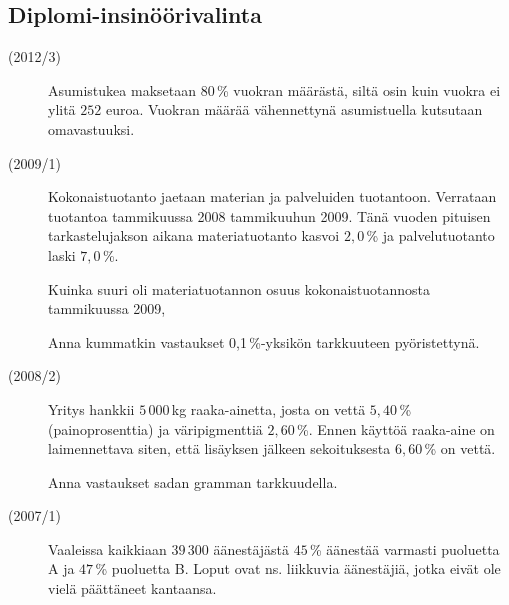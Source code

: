 \subsection*{Diplomi-insinöörivalinta}
\begin{description}
	\item[(2012/3)] Asumistukea maksetaan $80$\,\% vuokran määrästä, siltä osin kuin
        vuokra ei ylitä $252$ euroa. Vuokran määrää vähennettynä asumistuella
        kutsutaan omavastuuksi.
        
	
	\item[(2009/1)] Kokonaistuotanto jaetaan materian ja palveluiden tuotantoon. Verrataan tuotantoa tammikuussa 2008 tammikuuhun 2009. Tänä vuoden pituisen tarkastelujakson aikana materiatuotanto kasvoi $2,0$\,\% ja palvelutuotanto laski $7,0$\,\%.
	
	   Kuinka suuri oli materiatuotannon osuus kokonaistuotannosta tammikuussa 2009,
	   
    	
	   Anna kummatkin vastaukset 0,1\,\%-yksikön tarkkuuteen pyöristettynä.

	\item[(2008/2)] Yritys hankkii $5\,000$\,kg raaka-ainetta, josta on vettä $5,40$\,\% (painoprosenttia) ja väripigmenttiä $2,60$\,\%. Ennen käyttöä raaka-aine on laimennettava siten, että lisäyksen jälkeen sekoituksesta $6,60$\,\% on vettä.
	
    	
    	Anna vastaukset sadan gramman tarkkuudella.

	\item[(2007/1)] Vaaleissa kaikkiaan $39\,300$ äänestäjästä $45$\,\% äänestää varmasti puoluetta A ja $47$\,\% puoluetta B. Loput ovat ns. liikkuvia äänestäjiä, jotka eivät ole vielä päättäneet kantaansa.
	
	
\end{description}

